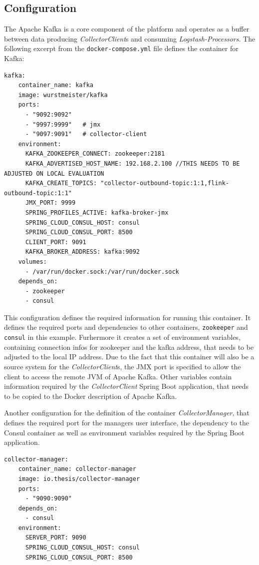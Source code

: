 \subsection{Configuration}

The Apache Kafka is a core component of the platform and operates as a buffer between data producing \textit{CollectorClient}s and consuming
\textit{Logstash-Processors}. The following excerpt from the \verb|docker-compose.yml| file defines the container for Kafka:
\begin{lstlisting}[caption={Container definition Kafka}, captionpos=b, label={lst:docker-kafka}]
  kafka:
    container_name: kafka
    image: wurstmeister/kafka
    ports:
      - "9092:9092"
      - "9997:9999"   # jmx
      - "9097:9091"   # collector-client
    environment:
      KAFKA_ZOOKEEPER_CONNECT: zookeeper:2181
      KAFKA_ADVERTISED_HOST_NAME: 192.168.2.100 //THIS NEEDS TO BE ADJUSTED ON LOCAL EVALUATION
      KAFKA_CREATE_TOPICS: "collector-outbound-topic:1:1,flink-outbound-topic:1:1"
      JMX_PORT: 9999
      SPRING_PROFILES_ACTIVE: kafka-broker-jmx
      SPRING_CLOUD_CONSUL_HOST: consul
      SPRING_CLOUD_CONSUL_PORT: 8500
      CLIENT_PORT: 9091
      KAFKA_BROKER_ADDRESS: kafka:9092
    volumes:
      - /var/run/docker.sock:/var/run/docker.sock
    depends_on:
      - zookeeper
      - consul
\end{lstlisting}

This configuration defines the required information for running this container. It defines the required ports and dependencies to other containers,
\verb|zookeeper| and \verb|consul| in this example. Furhermore it creates a set of environment variables, containing
connection infos for zookeeper and the kafka address, that needs to be adjusted to the local IP address. Due to the fact that
this container will also be a source system for the \textit{CollectorClient}s, the JMX port is specified to allow the client to access
the remote JVM of Apache Kafka. Other variables contain information
required by the \textit{CollectorClient} Spring Boot application, that needs to be copied to the Docker description of Apache Kafka.

Another configuration for the definition of the container \textit{CollectorManager}, that defines the required port for the managers user
interface, the dependency to the Consul container as well as environment variables required by the Spring Boot application.

\begin{lstlisting}[caption={CollectorManager container configuration}, captionpos=b, label={lst:docker-manager}]
  collector-manager:
    container_name: collector-manager
    image: io.thesis/collector-manager
    ports:
      - "9090:9090"
    depends_on:
      - consul
    environment:
      SERVER_PORT: 9090
      SPRING_CLOUD_CONSUL_HOST: consul
      SPRING_CLOUD_CONSUL_PORT: 8500
\end{lstlisting}


